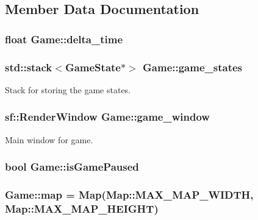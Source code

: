 \subsection{Member Data Documentation}
\hypertarget{class_game_ac66b5c6782d42e6c7344fad1cda50b67}{
\subsubsection[{delta\+\_\+time}]{\setlength{\rightskip}{0pt plus 5cm}float Game\+::delta\+\_\+time}}\label{class_game_ac66b5c6782d42e6c7344fad1cda50b67}
\hypertarget{class_game_a5ed7be8060ef5d384b62f384fb8662ed}{
\subsubsection[{game\+\_\+states}]{\setlength{\rightskip}{0pt plus 5cm}std\+::stack$<${\bf Game\+State}$\ast$$>$ Game\+::game\+\_\+states}}\label{class_game_a5ed7be8060ef5d384b62f384fb8662ed}


Stack for storing the game states. 

\hypertarget{class_game_ae19475408ec62b8ed6d4109b56d28b1d}{
\subsubsection[{game\+\_\+window}]{\setlength{\rightskip}{0pt plus 5cm}sf\+::\+Render\+Window Game\+::game\+\_\+window}}\label{class_game_ae19475408ec62b8ed6d4109b56d28b1d}


Main window for game. 

\hypertarget{class_game_aa897c46d369e8ab808ba5463691511da}{
\subsubsection[{is\+Game\+Paused}]{\setlength{\rightskip}{0pt plus 5cm}bool Game\+::is\+Game\+Paused}}\label{class_game_aa897c46d369e8ab808ba5463691511da}
\hypertarget{class_game_ab910de42d0cf4238d9d20815de472523}{
\subsubsection[{map}]{ Game\+::map = {\bf Map}({\bf Map\+::\+M\+A\+X\+\_\+\+M\+A\+P\+\_\+\+W\+I\+D\+T\+H}, {\bf Map\+::\+M\+A\+X\+\_\+\+M\+A\+P\+\_\+\+H\+E\+I\+G\+H\+T})\hspace{0.3cm}{\ttfamily [static]}}}\label{class_game_ab910de42d0cf4238d9d20815de472523}


